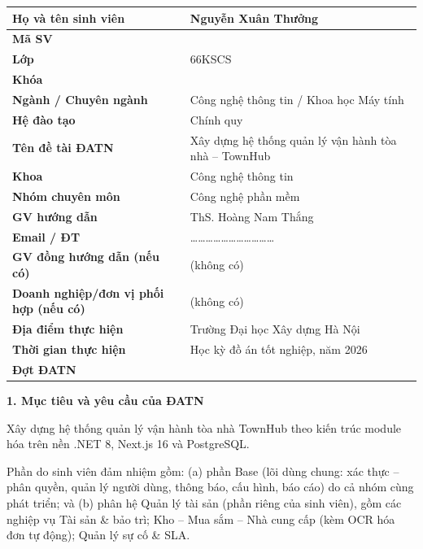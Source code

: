 \begin{center}{\singlespacing\renewcommand{\arraystretch}{1.25}
\begin{tabular}{|>{\raggedright\arraybackslash}p{}|>{\raggedright\arraybackslash}p{}|}
\hline
\textbf{Họ và tên sinh viên} & Nguyễn Xuân Thưởng \\ \hline
\textbf{Mã SV} & 0220766 \\ \hline
\textbf{Lớp} & 66KSCS \\ \hline
\textbf{Khóa} & 66 \\ \hline
\textbf{Ngành / Chuyên ngành} & Công nghệ thông tin / Khoa học Máy tính \\ \hline
\textbf{Hệ đào tạo} & Chính quy \\ \hline
\textbf{Tên đề tài ĐATN} & Xây dựng hệ thống quản lý vận hành tòa nhà – TownHub \\ \hline
\textbf{Khoa} & Công nghệ thông tin \\ \hline
\textbf{Nhóm chuyên môn} & Công nghệ phần mềm \\ \hline
\textbf{GV hướng dẫn} & ThS. Hoàng Nam Thắng \\ \hline
\textbf{Email / ĐT} & \ldots{}\ldots{}\ldots{}\ldots{}\ldots{}\ldots{}\ldots{}\ldots{}\ldots{}\ldots{}\ldots{} \\ \hline
\textbf{GV đồng hướng dẫn (nếu có)} & (không có) \\ \hline
\textbf{Doanh nghiệp/đơn vị phối hợp (nếu có)} & (không có) \\ \hline
\textbf{Địa điểm thực hiện} & Trường Đại học Xây dựng Hà Nội \\ \hline
\textbf{Thời gian thực hiện} & Học kỳ đồ án tốt nghiệp, năm 2026 \\ \hline
\textbf{Đợt ĐATN} & 2026 \\ \hline
\end{tabular}}\end{center}
\textbf{1. Mục tiêu và yêu cầu của ĐATN}

\textbullet{}  Xây dựng hệ thống quản lý vận hành tòa nhà TownHub theo kiến trúc module hóa trên nền .NET 8, Next.js 16 và PostgreSQL.

\textbullet{}  Phần do sinh viên đảm nhiệm gồm: (a) phần Base (lõi dùng chung: xác thực – phân quyền, quản lý người dùng, thông báo, cấu hình, báo cáo) do cả nhóm cùng phát triển; và (b) phân hệ Quản lý tài sản (phần riêng của sinh viên), gồm các nghiệp vụ Tài sản \& bảo trì; Kho – Mua sắm – Nhà cung cấp (kèm OCR hóa đơn tự động); Quản lý sự cố \& SLA.


